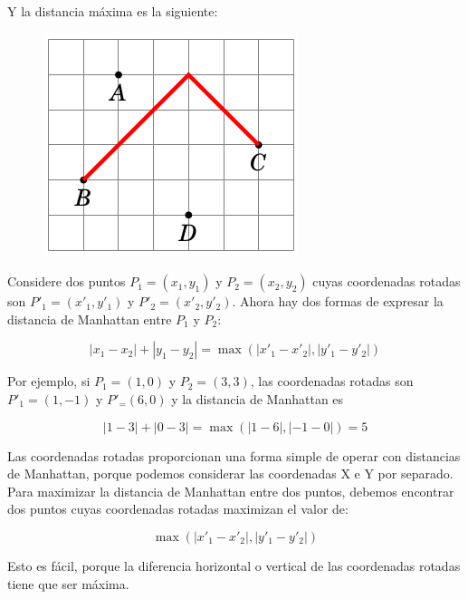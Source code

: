 Y la distancia máxima es la siguiente:

\begin{figure}[!h]
	\centering
	\includegraphics[width=0.25\linewidth]{img/diistance_functios_4}
	\label{fig:diistancefunctios4}
\end{figure}

Considere dos puntos $P_1 = (x_1, y_1)$ y $P_2 = (x_2, y_2)$ cuyas coordenadas rotadas son $P'_1 = (x'_1, y'_1)$ y $P'_2 = (x'_2, y'_2)$. Ahora hay dos formas de expresar la distancia de Manhattan entre $P_1$ y $P_2$:

$$|x_1-x_2|+|y_1-y_2| = \max (|x'_1-x'_2|,|y'_1-y'_2|)$$

Por ejemplo, si $P_1=(1,0)$ y $P_2=(3,3)$, las coordenadas rotadas son $P'_1=(1,-1)$ y $P'_=(6,0)$ y la distancia de Manhattan es

$$|1-3| + |0-3| = \max(|1-6|, |-1-0|) = 5$$

Las coordenadas rotadas proporcionan una forma simple de operar con distancias de Manhattan, porque podemos considerar las coordenadas X e Y por separado. Para maximizar la distancia de Manhattan entre dos puntos, debemos encontrar dos puntos cuyas coordenadas rotadas maximizan el valor de:

$$ \max (|x'_1-x'_2|,|y'_1-y'_2|) $$

Esto es fácil, porque la diferencia horizontal o vertical de las coordenadas rotadas tiene que ser máxima.

